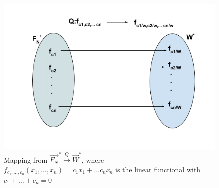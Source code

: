 \documentclass[journal,12pt,twocolumn]{IEEEtran}
\begin{document}
\begin{figure}[h!]
\centering
\includegraphics[scale=0.5]{Wdualmap.png}
\caption{Mapping from $\vec{F_N}^* \xrightarrow{Q} \vec{W}^*$, where \\ $f_{c_1,\hdots,c_n}(x_1, \hdots , x_n) = c_1x_1 + \hdots c_nx_n$ is the linear functional with $c_1+\hdots+c_n=0$} 
\end{figure}
\end{document}
